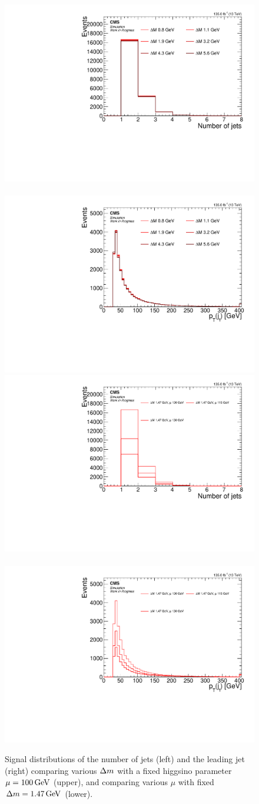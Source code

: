 \begin{figure}[!htb]
\centering
\includegraphics[width=0.48\linewidth]{plots/signal_common_distributions_fixed_mu/none_NJets.pdf} \,
\includegraphics[width=0.48\linewidth]{plots/signal_common_distributions_fixed_mu/none_LeadingJetPt.pdf}  \\
\includegraphics[width=0.48\linewidth]{plots/signal_common_distributions_fixed_dm/none_NJets.pdf} \,
\includegraphics[width=0.48\linewidth]{plots/signal_common_distributions_fixed_dm/none_LeadingJetPt.pdf}  \\
\caption[Signal number of jets and leading jet \pt distributions]{ Signal distributions of the number of jets (left) and the leading jet \pt (right) comparing various $\Delta m$ with a fixed higgsino parameter $\mu=100\,\text{Ge\hspace{-.08em}V}$ (upper), and comparing various $\mu$ with fixed $\Delta m=1.47\,\text{Ge\hspace{-.08em}V}$ (lower).}
\label{fig:signal-njets-ljpt}
\end{figure}


